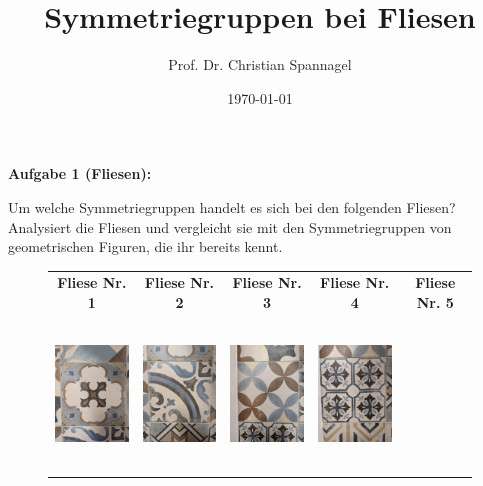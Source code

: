 \documentclass{cssheet}
\title{Symmetriegruppen bei Fliesen}
\author{Prof. Dr. Christian Spannagel}
\date{\today}
\begin{document}
\printtitle


\textbf{Aufgabe 1 (Fliesen):} 

Um welche Symmetriegruppen handelt es sich bei den folgenden Fliesen? Analysiert die Fliesen und vergleicht sie mit den Symmetriegruppen von geometrischen Figuren, die ihr bereits kennt.

\begin{figure}[H]
	\centering
	\setlength{\tabcolsep}{6pt} %
	\renewcommand{\arraystretch}{1.2} %
	\begin{tabular}{ccccc}
		\textbf{Fliese Nr. 1} & \textbf{Fliese Nr. 2} & \textbf{Fliese Nr. 3} & \textbf{Fliese Nr. 4} & \textbf{Fliese Nr. 5} \\
		\includegraphics[height=4cm]{fliesen/fliese01.jpg} &
		\includegraphics[height=4cm]{fliesen/fliese02.jpg} &
		\includegraphics[height=4cm]{fliesen/fliese03.jpg} &
		\includegraphics[height=4cm]{fliesen/fliese04.jpg} &

\end{tabular}
\end{figure}
\end{document}
